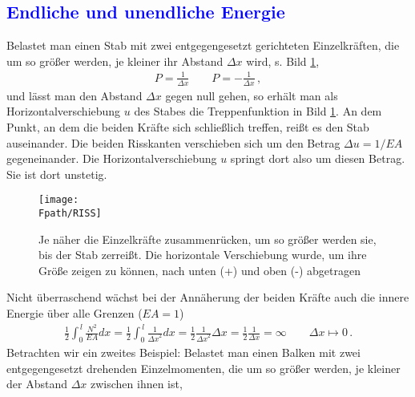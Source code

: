 {%
{\textcolor{blue}{\section{Endliche und unendliche Energie}}}\label{Endliche und unendliche Energie}
Belastet man einen Stab mit zwei  entgegengesetzt gerichteten Einzelkr\"{a}ften, die um so
gr\"{o}{\ss}er werden, je kleiner ihr Abstand $\Delta x$ wird, s. Bild \ref{Riss},
\begin{align}
P = \frac{1}{\Delta x} \qquad   P = - \frac{1}{\Delta x}\,,
\end{align}
und l\"{a}sst man den Abstand $\Delta x$ gegen null gehen, so erh\"{a}lt man als
Horizontalverschiebung $u$ des Stabes die Treppenfunktion in Bild \ref{Riss}. An dem
Punkt, an dem die beiden Kr\"{a}fte sich schlie{\ss}lich treffen, rei{\ss}t es den Stab auseinander.
Die beiden Risskanten verschieben sich um den Betrag $\Delta u = 1/EA$ gegeneinander.
Die Horizontalverschiebung $u$ springt dort also um diesen Betrag. Sie ist dort unstetig.
\begin{figure}[tbp] \centering
\if {} \sidecaption \fi
\texttt{[image: \\Fpath/RISS]}
\caption{Je n\"{a}her die Einzelkr\"{a}fte zusammenr\"{u}cken, um so gr\"{o}{\ss}er werden sie, bis der Stab
zerrei{\ss}t. Die horizontale Verschiebung wurde, um ihre Gr\"{o}{\ss}e zeigen zu k\"{o}nnen, nach unten
(+) und oben (-) abgetragen} \label{Riss}
\end{figure}%
Nicht \"{u}berraschend w\"{a}chst bei der Ann\"{a}herung der beiden Kr\"{a}fte auch die innere Energie
\"{u}ber alle Grenzen ($EA = 1$)
\begin{align}
\frac{1}{2}\int_0^{\,l} \frac{N^2}{EA}dx = \frac{1}{2}\int_0^{\,l} \frac{1}{{\Delta
x}^2} dx = \frac{1}{2} \frac{1}{{\Delta x}^2} \Delta x = \frac{1}{2}\frac{1}{\Delta x} =
\infty \qquad  \Delta x \mapsto 0 \,.
\end{align}
Betrachten wir ein zweites Beispiel: Belastet man einen Balken mit zwei entgegengesetzt
drehenden Einzelmomenten, die um so gr\"{o}{\ss}er werden, je kleiner der Abstand $\Delta x$
zwischen ihnen ist,
\begin{align}

\end{align}}
